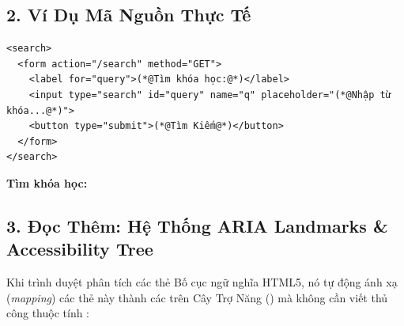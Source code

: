 \subsection{2. Ví Dụ Mã Nguồn Thực Tế}
\begin{codeWindow}
\begin{lstlisting}[language=HTML5]
<search>
  <form action="/search" method="GET">
    <label for="query">(*@Tìm khóa học:@*)</label>
    <input type="search" id="query" name="q" placeholder="(*@Nhập từ khóa...@*)">
    <button type="submit">(*@Tìm Kiếm@*)</button>
  </form>
</search>
\end{lstlisting}
\end{codeWindow}

\begin{browserWindow}
\sffamily\small
\textbf{Tìm khóa học:} \;\;
 \;\;
\end{browserWindow}

\subsection{3. Đọc Thêm: Hệ Thống ARIA Landmarks \& Accessibility Tree}

Khi trình duyệt phân tích các thẻ Bố cục ngữ nghĩa HTML5, nó tự động ánh xạ (\textit{mapping}) các thẻ này thành các  trên Cây Trợ Năng () mà không cần viết thủ công thuộc tính :

